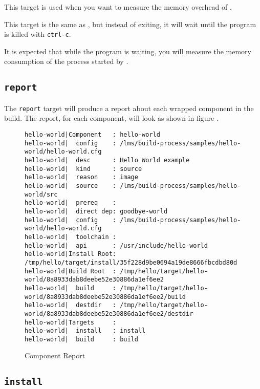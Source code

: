 This target is used when you want to measure the memory overhead of
\lmsbw.

This target is the same as , but
instead of exiting, it will wait until the program is killed with
\texttt{ctrl-c}.

It is expected that while the program is waiting, you will measure the
memory consumption of the \make process started by \lmsbw.

\subsection{\texttt{report}}\label{usinglmsbw:report}

The \texttt{report} target will produce a report about each wrapped
component in the build.  The report, for each component, will look
as shown in figure .

\begin{landscape}
\begin{figure}
\hrulefill
\begin{small}
\begin{verbatim}
hello-world|Component   : hello-world
hello-world|  config    : /lms/build-process/samples/hello-world/hello-world.cfg
hello-world|  desc      : Hello World example
hello-world|  kind      : source
hello-world|  reason    : image
hello-world|  source    : /lms/build-process/samples/hello-world/src
hello-world|  prereq    :
hello-world|  direct dep: goodbye-world
hello-world|  config    : /lms/build-process/samples/hello-world/hello-world.cfg
hello-world|  toolchain :
hello-world|  api       : /usr/include/hello-world
hello-world|Install Root: /tmp/hello/target/install/35f228d9be0694a19de8666fbcdbd80d
hello-world|Build Root  : /tmp/hello/target/hello-world/8a8933dab8deebe52e30886da1ef6ee2
hello-world|  build     : /tmp/hello/target/hello-world/8a8933dab8deebe52e30886da1ef6ee2/build
hello-world|  destdir   : /tmp/hello/target/hello-world/8a8933dab8deebe52e30886da1ef6ee2/destdir
hello-world|Targets     :
hello-world|  install   : install
hello-world|  build     : build
\end{verbatim}
\end{small}
\hrulefill
\caption{Component Report}\label{usinglmsbw:component-report}
\end{figure}
\end{landscape}

\subsection{\texttt{install}}

